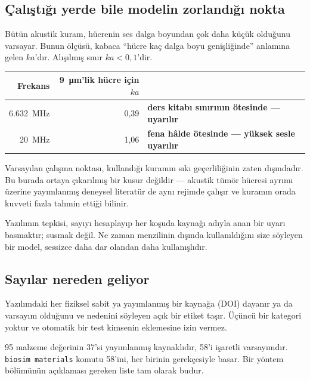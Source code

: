 \documentclass[11pt,a4paper]{article}
\begin{document}
\subsection*{Çalıştığı yerde bile modelin zorlandığı nokta}

Bütün akustik kuram, hücrenin ses dalga boyundan çok daha küçük olduğunu varsayar.
Bunun ölçüsü, kabaca ``hücre kaç dalga boyu genişliğinde'' anlamına gelen
$k a$'dır. Alışılmış sınır $ka < 0{,}1$'dir.

\begin{center}\small
\begin{tabular}{rrl}
\toprule
\textbf{Frekans} & \SI{9}{\micro\meter}'lik hücre için $ka$ & \\
\midrule
\SI{6,632}{\mega\hertz} & 0,39 & \textbf{ders kitabı sınırının ötesinde --- uyarılır} \\
\SI{20}{\mega\hertz}    & 1,06 & \textbf{fena hâlde ötesinde --- yüksek sesle uyarılır} \\
\bottomrule
\end{tabular}
\end{center}

\begin{warnbox}
Varsayılan çalışma noktası, kullandığı kuramın sıkı geçerliliğinin zaten
dışındadır. Bu burada ortaya çıkarılmış bir kusur değildir --- akustik tümör
hücresi ayrımı üzerine yayımlanmış deneysel literatür de aynı rejimde çalışır ve
kuramın orada kuvveti fazla tahmin ettiği bilinir.

Yazılımın tepkisi, sayıyı hesaplayıp her koşuda kaynağı adıyla anan bir uyarı
basmaktır; susmak değil. Ne zaman menzilinin dışında kullanıldığını size söyleyen
bir model, sessizce daha dar olandan daha kullanışlıdır.
\end{warnbox}

\subsection*{Sayılar nereden geliyor}

Yazılımdaki her fiziksel sabit ya yayımlanmış bir kaynağa (DOI) dayanır ya da
varsayım olduğunu ve nedenini söyleyen açık bir etiket taşır. Üçüncü bir kategori
yoktur ve otomatik bir test kimsenin eklemesine izin vermez.

95 malzeme değerinin 37'si yayımlanmış kaynaklıdır, 58'i işaretli varsayımdır.
\texttt{biosim materials} komutu 58'ini, her birinin gerekçesiyle basar. Bir
yöntem bölümünün açıklaması gereken liste tam olarak budur.
\end{document}
